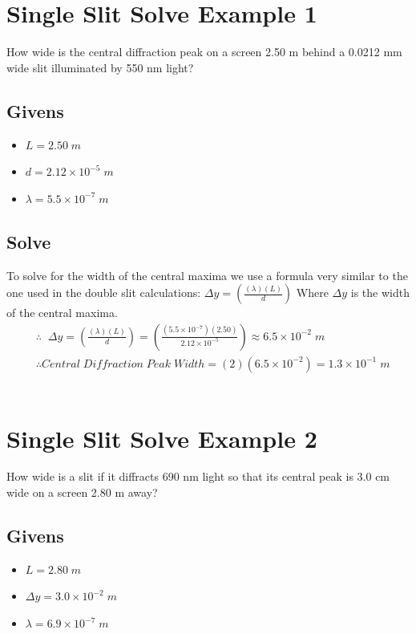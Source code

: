 \documentclass{article}
\begin{document}
\vspace{3cm}

\section{Single Slit Solve Example 1}
How wide is the central diffraction peak on a screen 2.50 m behind a 0.0212 mm wide slit illuminated by 550 nm light?
\subsection*{Givens}
\begin{itemize}
    \item $L = 2.50\;m$
    \item $d = 2.12 \times 10^{-5}\;m$
    \item $\lambda = 5.5 \times 10^{-7}\;m$
\end{itemize}\leavevmode
\subsection*{Solve}
To solve for the width of the central maxima we use a formula very similar to the one used in the double slit calculations: $\Delta y = \left(\frac{(\lambda)(L)}{d}\right)$ Where $\Delta y$ is the width of the central maxima.\\
\begin{align*}
     & \therefore\;\;\Delta y = \left(\frac{(\lambda)(L)}{d}\right) = \left(\frac{(5.5 \times 10^{-7})(2.50)}{2.12 \times 10^{-5}}\right) \approx 6.5 \times 10^{-2}\;m \\
     & \therefore Central\;Diffraction\;Peak\;Width = (2)(6.5 \times 10^{-2}) = 1.3 \times 10^{-1}\;m
\end{align*}\leavevmode\\

\section{Single Slit Solve Example 2}
How wide is a slit if it diffracts 690 nm light so that its central peak is 3.0 cm wide on a screen 2.80 m away?
\subsection*{Givens}
\begin{itemize}
    \item $L = 2.80\;m$
    \item $ \Delta y = 3.0 \times 10^{-2}\;m$
    \item $\lambda = 6.9 \times 10^{-7}\;m$
\end{itemize}\leavevmode
\end{document}
